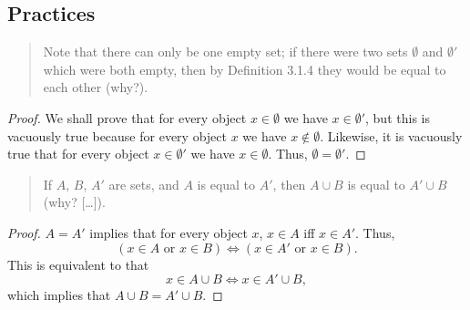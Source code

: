 \subsection{Practices}
\begin{quote}
    Note that there can only be one empty set; if there were two sets $\emptyset$ and $\emptyset'$ which were both empty, then by Definition 3.1.4 they would be equal to each other (why?).
\end{quote}
\begin{proof}
    We shall prove that for every object $x \in \emptyset$ we have $x \in \emptyset'$, but this is vacuously true because for every object $x$ we have $x \notin \emptyset$. Likewise, it is vacuously true that for every object $x \in \emptyset'$ we have $x \in \emptyset$. Thus, $\emptyset = \emptyset'$.
\end{proof}

\begin{quote}
    If $A$, $B$, $A'$ are sets, and $A$ is equal to $A'$, then $A \cup B$ is equal to $A' \cup B$ (why? [\ldots]).
\end{quote}
\begin{proof}
    $A=A'$ implies that for every object $x$, $x\in A$ iff $x\in A'$. Thus, \[(x\in A \text{ or } x\in B) \iff (x\in A' \text{ or } x\in B).\] This is equivalent to that \[x\in A\cup B \iff x\in A'\cup B,\] which implies that $A\cup B = A'\cup B$.
\end{proof}